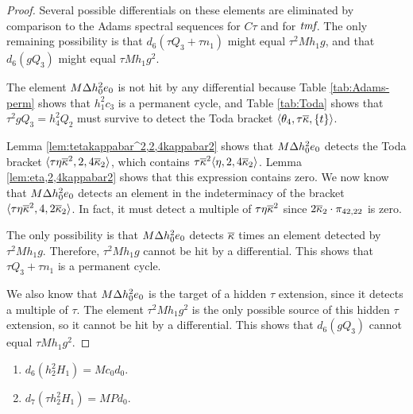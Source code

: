 \begin{proof}
Several possible differentials on these elements are eliminated
by comparison to the
Adams spectral sequences for $C\tau$ and for $\textit{tmf}$.
The only remaining possibility is that $d_6(\tau Q_3 + \tau n_1)$
might equal $\tau^2 M h_1 g$, and
that $d_6(g Q_3)$ might equal $\tau M h_1 g^2$.

The element $M \Delta h_0^2 e_0$ is not hit by any differential because
Table \ref{tab:Adams-perm} shows that $h_1^2 c_3$ is a permanent cycle,
and Table \ref{tab:Toda} shows that $\tau^2 g Q_3 = h_4^2 Q_2$
must survive to detect the Toda bracket
$\langle \theta_4, \tau \overline{\kappa}, \{ t\} \rangle$.

Lemma \ref{lem:tetakappabar^2,2,4kappabar2}
shows that $M \Delta h_0^2 e_0$ 
detects the Toda bracket
$\langle \tau \eta \overline{\kappa}^2, 2, 4 \overline{\kappa}_2 \rangle$, which
contains
$\tau \overline{\kappa}^2 \langle \eta, 2, 4 \overline{\kappa}_2 \rangle$.
Lemma \ref{lem:eta,2,4kappabar2} shows that
this expression contains zero.
We now know that $M \Delta h_0^2 e_0$ detects an element
in the indeterminacy of the bracket
$\langle \tau \eta \overline{\kappa}^2, 4, 2 \overline{\kappa}_2 \rangle$.
In fact, it must detect a multiple
of $\tau \eta \overline{\kappa}^2$ since
$2 \overline{\kappa}_2 \cdot \pi_{42,22}$ is zero.

The only possibility is that $M \Delta h_0^2 e_0$
detects $\overline{\kappa}$ times an element detected by $\tau^2 M h_1 g$.
Therefore, $\tau^2 M h_1 g$ cannot be hit by a differential.
This shows that $\tau Q_3 + \tau n_1$ is a permanent cycle.

We also know that $M \Delta h_0^2 e_0$ is the target
of a hidden $\tau$ extension, since it detects a multiple of $\tau$.
The element $\tau^2 M h_1 g^2$
is the only possible source of this hidden $\tau$ extension,
so it cannot be hit by a differential.
This shows that $d_6(g Q_3)$ cannot equal $\tau M h_1 g^2$.
\end{proof}

\begin{lemma}
\label{lem:d6-h2^2H1}
\mbox{}
\begin{enumerate}
\item
{}
$d_6(h_2^2 H_1) = M c_0 d_0$.
\item
{}
$d_7(\tau h_2^2 H_1) = M P d_0$.
\end{enumerate}
\end{lemma}

